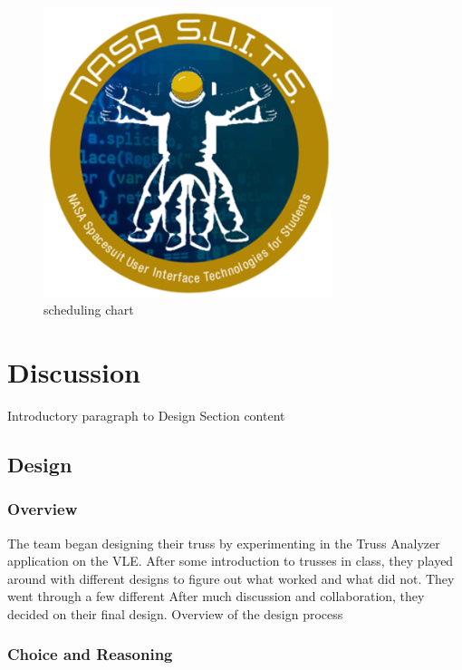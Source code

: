 \documentclass{article}
\let\Oldsection\section
\renewcommand{\section}{\FloatBarrier\Oldsection}
\let\Oldsubsection\subsection
\renewcommand{\subsection}{\FloatBarrier\Oldsubsection}
\let\Oldsubsubsection\subsubsection
\renewcommand{\subsubsection}{\FloatBarrier\Oldsubsubsection}
\begin{document}
  \begin{figure}[!htb]
    \centering
    \includegraphics[width=0.75\textwidth]{assets/logo.png}
    \caption{scheduling chart}
    \label{fig:spacesuitdisplay}
  \end{figure}
  
  \newpage
  
  \section{Discussion}
  
  Introductory paragraph to Design Section content
  
  \subsection{Design}
  
  \subsubsection{Overview}
  
  The team began designing their truss by experimenting in the Truss Analyzer application on the VLE. After some introduction to trusses in class, they played around with different designs to figure out what worked and what did not. They went through a few different  After much discussion and collaboration, they decided on their final design.
  Overview of the design process
  
  \subsubsection{Choice and Reasoning}
  
\end{document}
